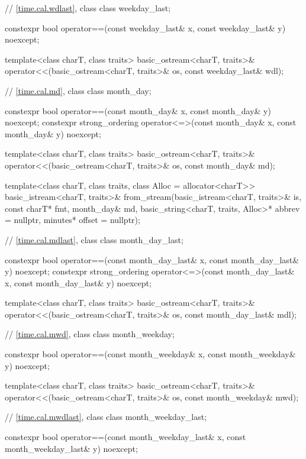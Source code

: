 \begin{codeblock}
{{    // \ref{time.cal.wdlast}, class 
    class weekday_last;

    constexpr bool operator==(const weekday_last& x, const weekday_last& y) noexcept;

    template<class charT, class traits>
      basic_ostream<charT, traits>&
        operator<<(basic_ostream<charT, traits>& os, const weekday_last& wdl);

    // \ref{time.cal.md}, class 
    class month_day;

    constexpr bool operator==(const month_day& x, const month_day& y) noexcept;
    constexpr strong_ordering operator<=>(const month_day& x, const month_day& y) noexcept;

    template<class charT, class traits>
      basic_ostream<charT, traits>&
        operator<<(basic_ostream<charT, traits>& os, const month_day& md);

    template<class charT, class traits, class Alloc = allocator<charT>>
      basic_istream<charT, traits>&
        from_stream(basic_istream<charT, traits>& is, const charT* fmt,
                    month_day& md, basic_string<charT, traits, Alloc>* abbrev = nullptr,
                    minutes* offset = nullptr);

    // \ref{time.cal.mdlast}, class 
    class month_day_last;

    constexpr bool operator==(const month_day_last& x, const month_day_last& y) noexcept;
    constexpr strong_ordering operator<=>(const month_day_last& x,
                                          const month_day_last& y) noexcept;

    template<class charT, class traits>
      basic_ostream<charT, traits>&
        operator<<(basic_ostream<charT, traits>& os, const month_day_last& mdl);

    // \ref{time.cal.mwd}, class 
    class month_weekday;

    constexpr bool operator==(const month_weekday& x, const month_weekday& y) noexcept;

    template<class charT, class traits>
      basic_ostream<charT, traits>&
        operator<<(basic_ostream<charT, traits>& os, const month_weekday& mwd);

    // \ref{time.cal.mwdlast}, class 
    class month_weekday_last;

    constexpr bool operator==(const month_weekday_last& x, const month_weekday_last& y) noexcept;

}}
\end{codeblock}
